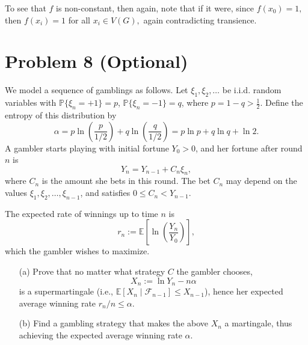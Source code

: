 \documentclass[11pt]{article}
\begin{document}
\begin{itemize}
\begin{solution}
        To see that $f$ is non-constant, then again, note that if it were, since $f(x_0) = 1,$ then $f(x_i) = 1$ for all $x_i \in V(G),$ again contradicting transience. 
    \end{solution}
\end{itemize}

\newpage

\section*{Problem 8 (Optional)}
We model a sequence of gamblings as follows. Let \(\xi_1, \xi_2, \ldots\) be i.i.d. random variables with \(\mathbb{P}\{\xi_n = +1\} = p\), \(\mathbb{P}\{\xi_n = -1\} = q\), where \(p = 1 - q > \frac{1}{2}\). Define the entropy of this distribution by
\[
\alpha = p \ln\left(\frac{p}{1/2}\right) + q \ln\left(\frac{q}{1/2}\right) = p \ln p + q \ln q + \ln 2.
\]
A gambler starts playing with initial fortune \(Y_0 > 0\), and her fortune after round \(n\) is
\[
Y_n = Y_{n-1} + C_n \xi_n,
\]
where \(C_n\) is the amount she bets in this round. The bet \(C_n\) may depend on the values \(\xi_1, \xi_2, \ldots, \xi_{n-1}\), and satisfies \(0 \leq C_n < Y_{n-1}\).

The expected rate of winnings up to time \(n\) is
\[
r_n := \mathbb{E} \left[\ln\left(\frac{Y_n}{Y_0}\right)\right],
\]
which the gambler wishes to maximize.

\begin{itemize}
    \item[(a)] Prove that no matter what strategy \(C\) the gambler chooses,
    \[
    X_n := \ln Y_n - n\alpha
    \]
    is a supermartingale (i.e., \(\mathbb{E}[X_n \mid \mathcal{F}_{n-1}] \leq X_{n-1}\)), hence her expected average winning rate \(r_n / n \leq \alpha\).
    \item[(b)] Find a gambling strategy that makes the above \(X_n\) a martingale, thus achieving the expected average winning rate \(\alpha\).
\end{itemize}
\end{document}
